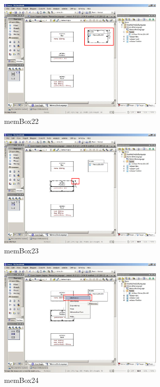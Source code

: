 \begin{figure}[!h]
	\centering
  \includegraphics[width=0.7\textwidth]{pics/memBox22.png}
	\caption{memBox22}
	\label{memBox22}
\end{figure}

\begin{figure}[!h]
	\centering
  \includegraphics[width=0.7\textwidth]{pics/memBox23.png}
	\caption{memBox23}
	\label{memBox23}
\end{figure}

\begin{figure}[!h]
	\centering
  \includegraphics[width=0.7\textwidth]{pics/memBox24.png}
	\caption{memBox24}
	\label{memBox24}
\end{figure}

